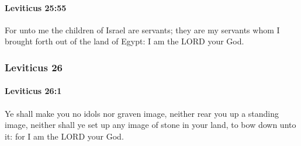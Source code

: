 		\paragraph{Leviticus 25:55} %
			\label{LEVITICUS-25-55}

			For unto me the children of Israel are servants; they are my servants whom I brought forth out of the land of Egypt: I am the LORD your God.

	\subsubsection{Leviticus 26} %
		\label{LEVITICUS-26}

		\paragraph{Leviticus 26:1} %
			\label{LEVITICUS-26-1}

			Ye shall make you no idols nor graven image, neither rear you up a standing image, neither shall ye set up any image of stone in your land, to bow down unto it: for I am the LORD your God.

